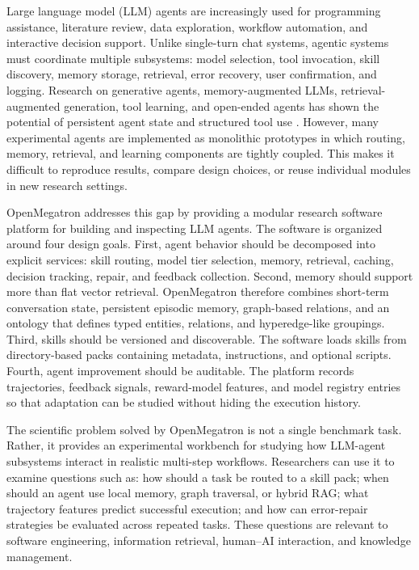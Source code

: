 \documentclass[preprint,12pt,a4paper]{elsarticle}
\begin{document}
Large language model (LLM) agents are increasingly used for programming assistance, literature review, data exploration, workflow automation, and interactive decision support. Unlike single-turn chat systems, agentic systems must coordinate multiple subsystems: model selection, tool invocation, skill discovery, memory storage, retrieval, error recovery, user confirmation, and logging. Research on generative agents, memory-augmented LLMs, retrieval-augmented generation, tool learning, and open-ended agents has shown the potential of persistent agent state and structured tool use \cite{park2023generative,zhang2024memgpt,lewis2020retrieval,schick2023toolformer,patil2023gorilla,wang2023voyager}. However, many experimental agents are implemented as monolithic prototypes in which routing, memory, retrieval, and learning components are tightly coupled. This makes it difficult to reproduce results, compare design choices, or reuse individual modules in new research settings.

OpenMegatron addresses this gap by providing a modular research software platform for building and inspecting LLM agents. The software is organized around four design goals. First, agent behavior should be decomposed into explicit services: skill routing, model tier selection, memory, retrieval, caching, decision tracking, repair, and feedback collection. Second, memory should support more than flat vector retrieval. OpenMegatron therefore combines short-term conversation state, persistent episodic memory, graph-based relations, and an ontology that defines typed entities, relations, and hyperedge-like groupings. Third, skills should be versioned and discoverable. The software loads skills from directory-based packs containing metadata, instructions, and optional scripts. Fourth, agent improvement should be auditable. The platform records trajectories, feedback signals, reward-model features, and model registry entries so that adaptation can be studied without hiding the execution history.

The scientific problem solved by OpenMegatron is not a single benchmark task. Rather, it provides an experimental workbench for studying how LLM-agent subsystems interact in realistic multi-step workflows. Researchers can use it to examine questions such as: how should a task be routed to a skill pack; when should an agent use local memory, graph traversal, or hybrid RAG; what trajectory features predict successful execution; and how can error-repair strategies be evaluated across repeated tasks. These questions are relevant to software engineering, information retrieval, human--AI interaction, and knowledge management.
\end{document}
